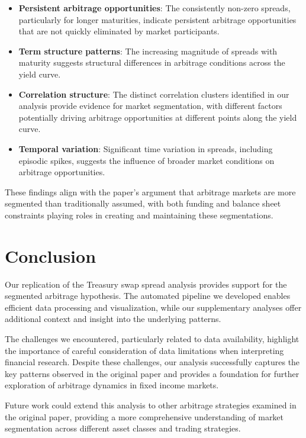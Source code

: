 \documentclass[12pt]{article}
\begin{document}
\begin{itemize}
    \item \textbf{Persistent arbitrage opportunities}: The consistently non-zero spreads, particularly for longer maturities, indicate persistent arbitrage opportunities that are not quickly eliminated by market participants.
    
    \item \textbf{Term structure patterns}: The increasing magnitude of spreads with maturity suggests structural differences in arbitrage conditions across the yield curve.
    
    \item \textbf{Correlation structure}: The distinct correlation clusters identified in our analysis provide evidence for market segmentation, with different factors potentially driving arbitrage opportunities at different points along the yield curve.
    
    \item \textbf{Temporal variation}: Significant time variation in spreads, including episodic spikes, suggests the influence of broader market conditions on arbitrage opportunities.
\end{itemize}

These findings align with the paper's argument that arbitrage markets are more segmented than traditionally assumed, with both funding and balance sheet constraints playing roles in creating and maintaining these segmentations.

\section{Conclusion}

Our replication of the Treasury swap spread analysis provides support for the segmented arbitrage hypothesis. The automated pipeline we developed enables efficient data processing and visualization, while our supplementary analyses offer additional context and insight into the underlying patterns.

The challenges we encountered, particularly related to data availability, highlight the importance of careful consideration of data limitations when interpreting financial research. Despite these challenges, our analysis successfully captures the key patterns observed in the original paper and provides a foundation for further exploration of arbitrage dynamics in fixed income markets.

Future work could extend this analysis to other arbitrage strategies examined in the original paper, providing a more comprehensive understanding of market segmentation across different asset classes and trading strategies.
\end{document}
